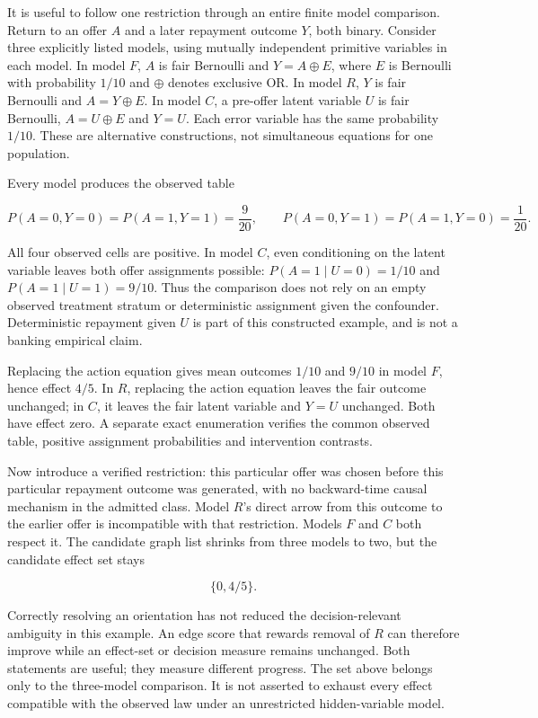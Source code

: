 It is useful to follow one restriction through an entire finite model
comparison. Return to an offer \(A\) and a later repayment outcome
\(Y\), both binary. Consider three explicitly listed models, using
mutually independent primitive variables in each model. In model \(F\),
\(A\) is fair Bernoulli and \(Y=A\mathbin{\oplus}E\), where \(E\) is
Bernoulli with probability \(1/10\) and \(\oplus\) denotes exclusive OR.
In model \(R\), \(Y\) is fair Bernoulli and \(A=Y\mathbin{\oplus}E\). In
model \(C\), a pre-offer latent variable \(U\) is fair Bernoulli,
\(A=U\mathbin{\oplus}E\) and \(Y=U\). Each error variable has the same
probability \(1/10\). These are alternative constructions, not
simultaneous equations for one population.

Every model produces the observed table

\[
 P(A=0,Y=0)=P(A=1,Y=1)=\frac9{20},\qquad
 P(A=0,Y=1)=P(A=1,Y=0)=\frac1{20}.
\]

All four observed cells are positive. In model \(C\), even conditioning
on the latent variable leaves both offer assignments possible:
\(P(A=1\mid U=0)=1/10\) and \(P(A=1\mid U=1)=9/10\). Thus the comparison
does not rely on an empty observed treatment stratum or deterministic
assignment given the confounder. Deterministic repayment given \(U\) is
part of this constructed example, and is not a banking empirical claim.

Replacing the action equation gives mean outcomes \(1/10\) and \(9/10\)
in model \(F\), hence effect \(4/5\). In \(R\), replacing the action
equation leaves the fair outcome unchanged; in \(C\), it leaves the fair
latent variable and \(Y=U\) unchanged. Both have effect zero. A separate
exact enumeration verifies the common observed table, positive
assignment probabilities and intervention contrasts.
\citep{exec13_diagram_restrictions}

Now introduce a verified restriction: this particular offer was chosen
before this particular repayment outcome was generated, with no
backward-time causal mechanism in the admitted class. Model \(R\)'s
direct arrow from this outcome to the earlier offer is incompatible with
that restriction. Models \(F\) and \(C\) both respect it. The candidate
graph list shrinks from three models to two, but the candidate effect
set stays

\[
 \{0,4/5\}.
\]

Correctly resolving an orientation has not reduced the decision-relevant
ambiguity in this example. An edge score that rewards removal of \(R\)
can therefore improve while an effect-set or decision measure remains
unchanged. Both statements are useful; they measure different progress.
The set above belongs only to the three-model comparison. It is not
asserted to exhaust every effect compatible with the observed law under
an unrestricted hidden-variable model.

